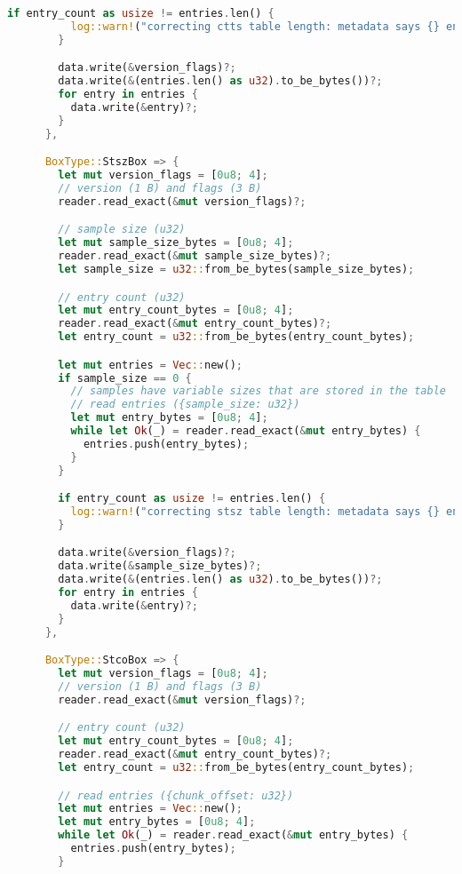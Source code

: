 \begin{lstlisting}[language=Rust]
        if entry_count as usize != entries.len() {
          log::warn!("correcting ctts table length: metadata says {} entries, but should actually be {} entries", entry_count, entries.len());
        }

        data.write(&version_flags)?;
        data.write(&(entries.len() as u32).to_be_bytes())?;
        for entry in entries {
          data.write(&entry)?;
        }
      },

      BoxType::StszBox => {
        let mut version_flags = [0u8; 4];
        // version (1 B) and flags (3 B)
        reader.read_exact(&mut version_flags)?;

        // sample size (u32)
        let mut sample_size_bytes = [0u8; 4];
        reader.read_exact(&mut sample_size_bytes)?;
        let sample_size = u32::from_be_bytes(sample_size_bytes);

        // entry count (u32)
        let mut entry_count_bytes = [0u8; 4];
        reader.read_exact(&mut entry_count_bytes)?;
        let entry_count = u32::from_be_bytes(entry_count_bytes);

        let mut entries = Vec::new();
        if sample_size == 0 {
          // samples have variable sizes that are stored in the table
          // read entries ({sample_size: u32})
          let mut entry_bytes = [0u8; 4];
          while let Ok(_) = reader.read_exact(&mut entry_bytes) {
            entries.push(entry_bytes);
          }
        }

        if entry_count as usize != entries.len() {
          log::warn!("correcting stsz table length: metadata says {} entries, but should actually be {} entries", entry_count, entries.len());
        }

        data.write(&version_flags)?;
        data.write(&sample_size_bytes)?;
        data.write(&(entries.len() as u32).to_be_bytes())?;
        for entry in entries {
          data.write(&entry)?;
        }
      },

      BoxType::StcoBox => {
        let mut version_flags = [0u8; 4];
        // version (1 B) and flags (3 B)
        reader.read_exact(&mut version_flags)?;

        // entry count (u32)
        let mut entry_count_bytes = [0u8; 4];
        reader.read_exact(&mut entry_count_bytes)?;
        let entry_count = u32::from_be_bytes(entry_count_bytes);

        // read entries ({chunk_offset: u32})
        let mut entries = Vec::new();
        let mut entry_bytes = [0u8; 4];
        while let Ok(_) = reader.read_exact(&mut entry_bytes) {
          entries.push(entry_bytes);
        }


\end{lstlisting}
